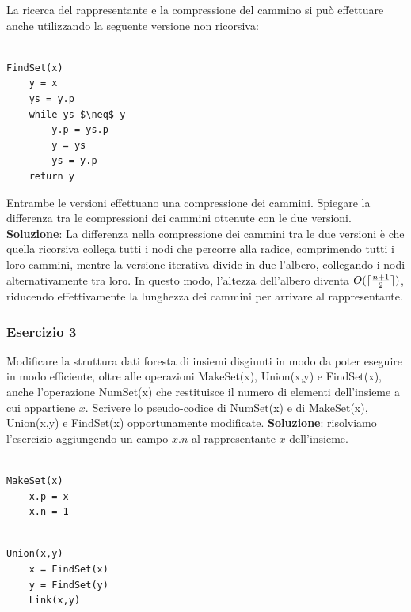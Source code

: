 La ricerca del rappresentante e la compressione del cammino si può effettuare anche utilizzando la seguente versione non ricorsiva:

\begin{lstlisting}[mathescape=true]

FindSet(x)
	y = x
	ys = y.p
	while ys $\neq$ y
		y.p = ys.p
		y = ys
		ys = y.p
	return y

\end{lstlisting}

Entrambe le versioni effettuano una compressione dei cammini. Spiegare la differenza tra le compressioni dei cammini ottenute con le due versioni.
\linebreak
\linebreak
\textbf{Soluzione}: La differenza nella compressione dei cammini tra le due versioni è che quella ricorsiva collega tutti i nodi che percorre alla radice, comprimendo tutti i loro cammini, mentre la versione iterativa divide in due l'albero, collegando i nodi alternativamente tra loro. In questo modo, l'altezza dell'albero diventa $O(\lceil\frac{n+1}{2}\rceil)$, riducendo effettivamente la lunghezza dei cammini per arrivare al rappresentante.

\subsubsection{Esercizio 3}

Modificare la struttura dati foresta di insiemi disgiunti in modo da poter eseguire in modo efficiente, oltre alle operazioni MakeSet(x), Union(x,y) e FindSet(x), anche l'operazione NumSet(x) che restituisce il numero di elementi dell'insieme a cui appartiene $x$. Scrivere lo pseudo-codice di NumSet(x) e di MakeSet(x), Union(x,y) e FindSet(x) opportunamente modificate.
\linebreak
\linebreak
\textbf{Soluzione}: risolviamo l'esercizio aggiungendo un campo $x.n$ al rappresentante $x$ dell'insieme.

\begin{lstlisting}

MakeSet(x)
	x.p = x
	x.n = 1

\end{lstlisting}

\begin{lstlisting}

Union(x,y)
	x = FindSet(x)
	y = FindSet(y)
	Link(x,y)

\end{lstlisting}

